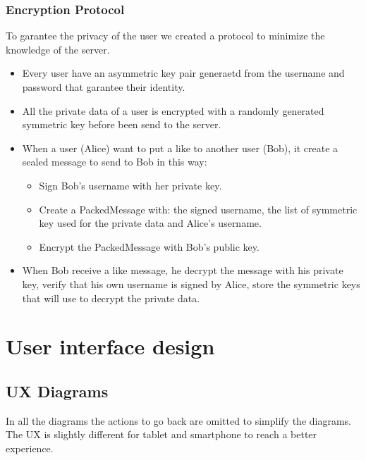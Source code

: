 \documentclass{article}
\begin{document}
\subsubsection{Encryption Protocol}
To garantee the privacy of the user we created a protocol to minimize the knowledge of the server. 
\begin{itemize}
	\item Every user have an asymmetric key pair generaetd from the username and password that garantee their identity.
	\item All the private data of a user is encrypted with a randomly generated symmetric key before been send to the server.
	\item When a user (Alice) want to put a like to another user (Bob), it create a sealed message to send to Bob in this way:
		\begin{itemize}
			\item Sign Bob's username with her private key.
			\item Create a PackedMessage with: the signed username, the list of symmetric key used for the private data and Alice's username.
			\item Encrypt the PackedMessage with Bob's public key.
		\end{itemize}
	\item When Bob receive a like message, he decrypt the message with his private key, verify that his own username is signed by Alice, store the symmetric keys that will use to decrypt the private data.
\end{itemize}

\newpage

\section{User interface design}
\label{sec:UI}


\subsection{UX Diagrams}
In all the diagrams the actions to go back are omitted to simplify the diagrams.
The UX is slightly different for tablet and smartphone to reach a better experience.
\end{document}
